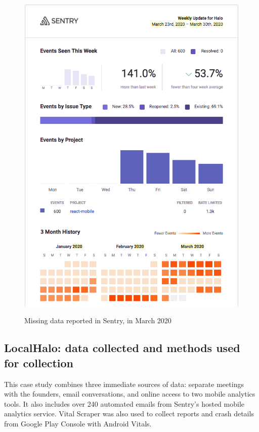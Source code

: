\begin{figure}[htbp!]
\begin{minipage}{.45\textwidth}
  \includegraphics[width=\textwidth]{images/localhalo/sentry-weekly-report-23-mar-2020.png}
  \label{fig:localhalo-sentry-weekly-report-23-mar-2020}
\end{minipage}
    \caption{Missing data reported in Sentry, in March 2020}
    \label{fig:sentry-missing-data-march-2020}
\end{figure}


\subsection{LocalHalo: data collected and methods used for collection}
This case study combines three immediate sources of data: separate meetings with the founders, email conversations, and online access to two mobile analytics tools. It also includes over 240 automated emails from Sentry's hosted mobile analytics service. Vital Scraper was also used to collect reports and crash details from Google Play Console with Android Vitals.


